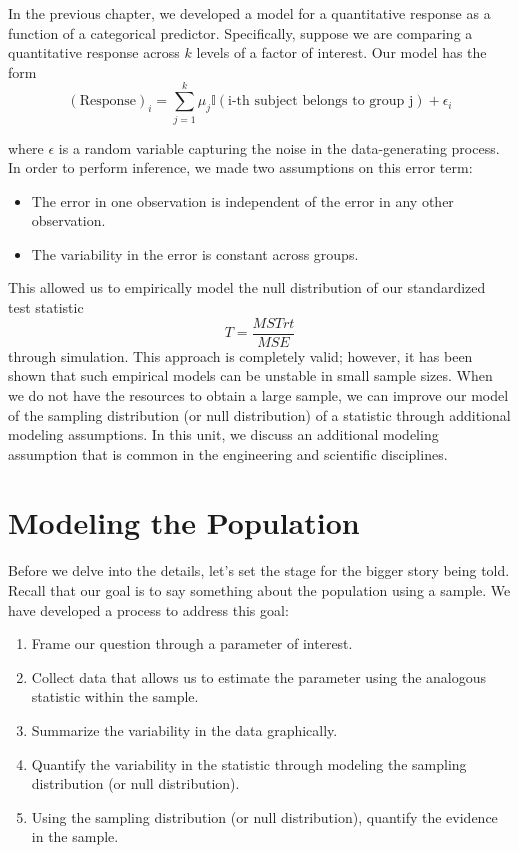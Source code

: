 \documentclass[]{book}
\providecommand{\tightlist}{%
  \setlength{\itemsep}{0pt}\setlength{\parskip}{0pt}}
\theoremstyle{definition}
\theoremstyle{definition}
\theoremstyle{definition}
\theoremstyle{remark}
\begin{document}
In the previous chapter, we developed a model for a quantitative
response as a function of a categorical predictor. Specifically, suppose
we are comparing a quantitative response across \(k\) levels of a factor
of interest. Our model has the form
\[(\text{Response})_i = \sum_{j=1}^{k} \mu_j \mathbb{I}\left(\text{i-th subject belongs to group j}\right) + \epsilon_i\]

where \(\epsilon\) is a random variable capturing the noise in the
data-generating process. In order to perform inference, we made two
assumptions on this error term:

\begin{itemize}
\tightlist
\item
  The error in one observation is independent of the error in any other
  observation.
\item
  The variability in the error is constant across groups.
\end{itemize}

This allowed us to empirically model the null distribution of our
standardized test statistic \[T = \frac{MSTrt}{MSE}\] through
simulation. This approach is completely valid; however, it has been
shown that such empirical models can be unstable in small sample sizes.
When we do not have the resources to obtain a large sample, we can
improve our model of the sampling distribution (or null distribution) of
a statistic through additional modeling assumptions. In this unit, we
discuss an additional modeling assumption that is common in the
engineering and scientific disciplines.

\section{Modeling the Population}\label{modeling-the-population}

Before we delve into the details, let's set the stage for the bigger
story being told. Recall that our goal is to say something about the
population using a sample. We have developed a process to address this
goal:

\begin{enumerate}
\def\labelenumi{\arabic{enumi}.}
\tightlist
\item
  Frame our question through a parameter of interest.
\item
  Collect data that allows us to estimate the parameter using the
  analogous statistic within the sample.
\item
  Summarize the variability in the data graphically.
\item
  Quantify the variability in the statistic through modeling the
  sampling distribution (or null distribution).
\item
  Using the sampling distribution (or null distribution), quantify the
  evidence in the sample.
\end{enumerate}
\end{document}
